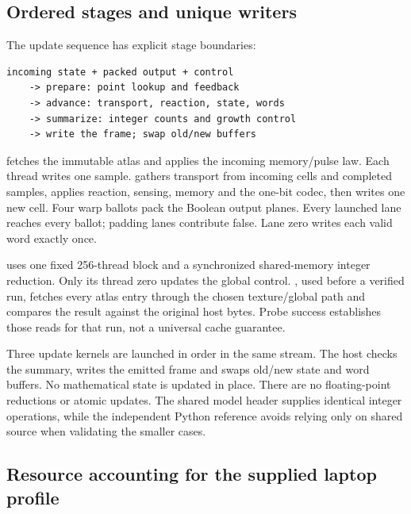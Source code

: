 \documentclass[11pt,a4paper]{article}
\begin{document}
\FloatBarrier

\subsection{Ordered stages and unique writers}\label{ordered-stages-and-unique-writers}

The update sequence has explicit stage boundaries:

\par
\begin{minipage}{\linewidth}
\begin{verbatim}
incoming state + packed output + control
    -> prepare: point lookup and feedback
    -> advance: transport, reaction, state, words
    -> summarize: integer counts and growth control
    -> write the frame; swap old/new buffers
\end{verbatim}
\end{minipage}
\par

 fetches the immutable atlas and applies the incoming memory/pulse law. Each thread writes one sample.  gathers transport from incoming cells and completed samples, applies reaction, sensing, memory and the one-bit codec, then writes one new cell. Four warp ballots pack the Boolean output planes. Every launched lane reaches every ballot; padding lanes contribute false. Lane zero writes each valid word exactly once.

 uses one fixed 256-thread block and a synchronized shared-memory integer reduction. Only its thread zero updates the global control. , used before a verified run, fetches every atlas entry through the chosen texture/global path and compares the result against the original host bytes. Probe success establishes those reads for that run, not a universal cache guarantee.

Three update kernels are launched in order in the same stream. The host checks the summary, writes the emitted frame and swaps old/new state and word buffers. No mathematical state is updated in place. There are no floating-point reductions or atomic updates. The shared model header supplies identical integer operations, while the independent Python reference avoids relying only on shared source when validating the smaller cases.


\subsection{Resource accounting for the supplied laptop profile}\label{resource-accounting-for-the-supplied-laptop-profile}
\end{document}
